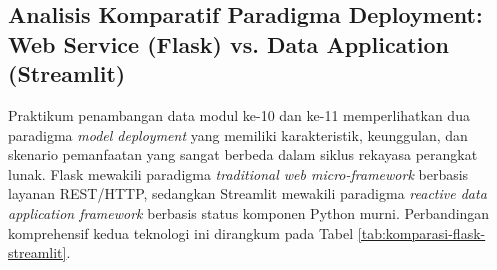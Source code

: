 \documentclass[a4paper,oneside,11pt]{book}
\begin{document}
\subsection{Analisis Komparatif Paradigma Deployment: Web Service (Flask) vs. Data Application (Streamlit)}

\par Praktikum penambangan data modul ke-10 dan ke-11 memperlihatkan dua paradigma \textit{model deployment} yang memiliki karakteristik, keunggulan, dan skenario pemanfaatan yang sangat berbeda dalam siklus rekayasa perangkat lunak. Flask mewakili paradigma \textit{traditional web micro-framework} berbasis layanan REST/HTTP, sedangkan Streamlit mewakili paradigma \textit{reactive data application framework} berbasis status komponen Python murni. Perbandingan komprehensif kedua teknologi ini dirangkum pada Tabel \ref{tab:komparasi-flask-streamlit}.
\end{document}
